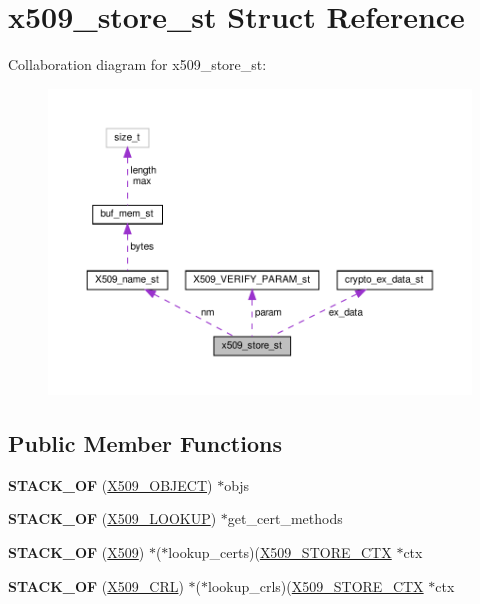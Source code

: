 \hypertarget{structx509__store__st}{}\section{x509\+\_\+store\+\_\+st Struct Reference}
\label{structx509__store__st}


Collaboration diagram for x509\+\_\+store\+\_\+st\+:
\nopagebreak
\begin{figure}[H]
\begin{center}
\leavevmode
\includegraphics[width=350pt]{structx509__store__st__coll__graph}
\end{center}
\end{figure}
\subsection*{Public Member Functions}
\begin{DoxyCompactItemize}
\item 
\mbox{\label{structx509__store__st_a3802443396e8862b5ab6c22172cfd6ff}} 
{\bfseries S\+T\+A\+C\+K\+\_\+\+OF} (\hyperlink{structx509__object__st}{X509\+\_\+\+O\+B\+J\+E\+CT}) $\ast$objs
\item 
\mbox{\label{structx509__store__st_aefdf9aec0a4c6f004e6d60aebe25e277}} 
{\bfseries S\+T\+A\+C\+K\+\_\+\+OF} (\hyperlink{structx509__lookup__st}{X509\+\_\+\+L\+O\+O\+K\+UP}) $\ast$get\+\_\+cert\+\_\+methods
\item 
\mbox{\label{structx509__store__st_ae58df4d40c98ddc37a455e00a000aef0}} 
{\bfseries S\+T\+A\+C\+K\+\_\+\+OF} (\hyperlink{structx509__st}{X509}) $\ast$($\ast$lookup\+\_\+certs)(\hyperlink{structx509__store__ctx__st}{X509\+\_\+\+S\+T\+O\+R\+E\+\_\+\+C\+TX} $\ast$ctx
\item 
\mbox{\label{structx509__store__st_a88a0eb9a5c3d18308bcf136143572ca8}} 
{\bfseries S\+T\+A\+C\+K\+\_\+\+OF} (\hyperlink{structX509__crl__st}{X509\+\_\+\+C\+RL}) $\ast$($\ast$lookup\+\_\+crls)(\hyperlink{structx509__store__ctx__st}{X509\+\_\+\+S\+T\+O\+R\+E\+\_\+\+C\+TX} $\ast$ctx
\end{DoxyCompactItemize}
